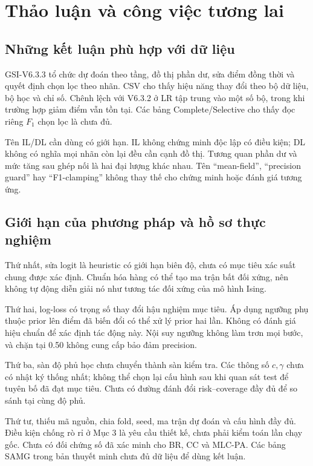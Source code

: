 \documentclass[11pt,a4paper]{article}
\begin{document}
\section{Thảo luận và công việc tương lai}
\subsection{Những kết luận phù hợp với dữ liệu}
GSI-V6.3.3 tổ chức dự đoán theo tầng, đồ thị phần dư, sửa điểm đồng thời và quyết định chọn lọc theo nhãn. CSV cho thấy hiệu năng thay đổi theo bộ dữ liệu, bộ học và chỉ số. Chênh lệch với V6.3.2 ở LR tập trung vào một số bộ, trong khi trường hợp giảm điểm vẫn tồn tại. Các bảng Complete/Selective cho thấy đọc riêng $F_1$ chọn lọc là chưa đủ.

Tên IL/DL cần dùng có giới hạn. IL không chứng minh độc lập có điều kiện; DL không có nghĩa mọi nhãn còn lại đều cần cạnh đồ thị. Tương quan phần dư và mức tăng sau ghép nối là hai đại lượng khác nhau. Tên “mean-field”, “precision guard” hay “F1-clamping” không thay thế cho chứng minh hoặc đánh giá tương ứng.

\subsection{Giới hạn của phương pháp và hồ sơ thực nghiệm}
Thứ nhất, sửa logit là heuristic có giới hạn biên độ, chưa có mục tiêu xác suất chung được xác định. Chuẩn hóa hàng có thể tạo ma trận bất đối xứng, nên không tự động diễn giải nó như tương tác đối xứng của mô hình Ising.

Thứ hai, log-loss có trọng số thay đổi hậu nghiệm mục tiêu. Áp dụng ngưỡng phụ thuộc prior lên điểm đã biến đổi có thể xử lý prior hai lần. Không có đánh giá hiệu chuẩn để xác định tác động này. Nội suy ngưỡng không làm trơn mọi bước, và chặn tại 0.50 không cung cấp bảo đảm precision.

Thứ ba, sàn độ phủ học chưa chuyển thành sàn kiểm tra. Các thông số $c,\gamma$ chưa có nhật ký thống nhất; không thể chọn lại cấu hình sau khi quan sát test để tuyên bố đã đạt mục tiêu. Chưa có đường đánh đổi risk--coverage đầy đủ để so sánh tại cùng độ phủ.

Thứ tư, thiếu mã nguồn, chia fold, seed, ma trận dự đoán và cấu hình đầy đủ. Điều kiện chống rò rỉ ở Mục 3 là yêu cầu thiết kế, chưa phải kiểm toán lần chạy gốc. Chưa có đối chứng số đã xác minh cho BR, CC và MLC-PA. Các bảng SAMG trong bản thuyết minh chưa đủ dữ liệu để dùng kết luận.
\end{document}
